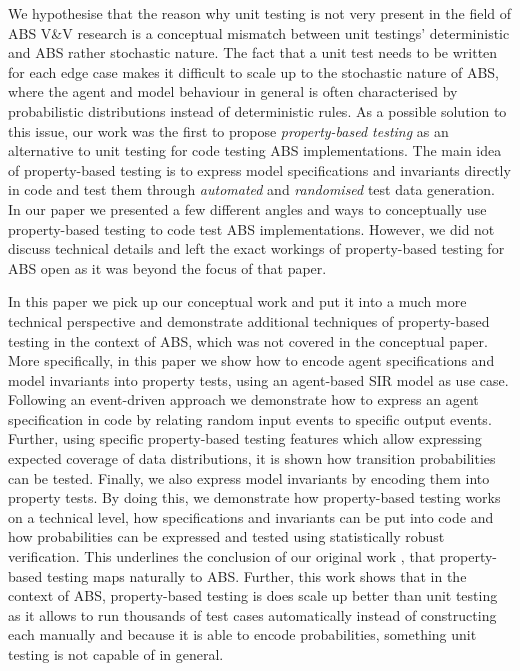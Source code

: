 We hypothesise that the reason why unit testing is not very present in the field of ABS V\&V research is a conceptual mismatch between unit testings' deterministic and ABS rather stochastic nature. The fact that a unit test needs to be written for each edge case makes it difficult to scale up to the stochastic nature of ABS, where the agent and model behaviour in general is often characterised by probabilistic distributions instead of deterministic rules. As a possible solution to this issue, our work \cite{thaler_show_2019} was the first to propose \textit{property-based testing} as an alternative to unit testing for code testing ABS implementations. The main idea of property-based testing is to express model specifications and invariants directly in code and test them through \textit{automated} and \textit{randomised} test data generation. In our paper \cite{thaler_show_2019} we presented a few different angles and ways to conceptually use property-based testing to code test ABS implementations. However, we did not discuss technical details and left the exact workings of property-based testing for ABS open as it was beyond the focus of that paper.

In this paper we pick up our conceptual work \cite{thaler_show_2019} and put it into a much more technical perspective and demonstrate additional techniques of property-based testing in the context of ABS, which was not covered in the conceptual paper. More specifically, in this paper we show how to encode agent specifications and model invariants into property tests, using an agent-based SIR model \cite{macal_agent-based_2010} as use case. Following an event-driven approach we demonstrate how to express an agent specification in code by relating random input events to specific output events. Further, using specific property-based testing features which allow expressing expected coverage of data distributions, it is shown how transition probabilities can be tested. Finally, we also express model invariants by encoding them into property tests. By doing this, we demonstrate how property-based testing works on a technical level, how specifications and invariants can be put into code and how probabilities can be expressed and tested using statistically robust verification. This underlines the conclusion of our original work \cite{thaler_show_2019}, that property-based testing maps naturally to ABS. Further, this work shows that in the context of ABS, property-based testing is does scale up better than unit testing as it allows to run thousands of test cases automatically instead of constructing each manually and because it is able to encode probabilities, something unit testing is not capable of in general.

